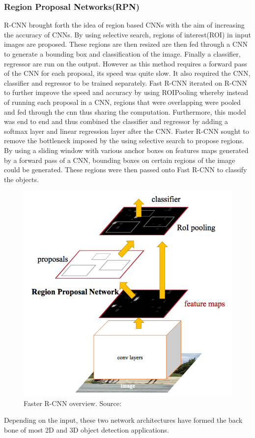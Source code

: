 \subsubsection*{Region Proposal Networks(RPN)}
R-CNN\cite{girshick2014rich} brought forth the idea of region based CNNs with the aim of increasing the accuracy of CNNs. By using selective search, regions of interest(ROI) in input images are proposed. These regions are then resized are then fed through a CNN to generate a bounding box and classification of the image. Finally a classifier, regressor are run on the output. However as this method requires a forward pass of the CNN for each proposal, its speed was quite slow. It also required the CNN, classifier and regressor to be trained separately. 
Fast R-CNN\cite{girshickICCV15fastrcnn} iterated on R-CNN to further improve the speed and accuracy by using ROIPooling whereby instead of running each proposal in a CNN, regions that were overlapping were pooled and fed through the cnn thus sharing the computation. Furthermore, this model was end to end and thus combined the  classifier and regressor  by adding a softmax layer and linear regression layer after the CNN.
Faster R-CNN\cite{ren2015faster} sought to remove the bottleneck imposed by the using selective search to propose regions. By using a sliding window with various anchor boxes on features maps generated by a forward pass of a CNN, bounding boxes on certain regions of the image could be generated. These regions were then passed onto Fast R-CNN to classify the objects. 
\begin{figure}[h]
	\centering
	\includegraphics[width=0.5\linewidth]{images/fastercnn}
	\caption{Faster R-CNN overview. Source:\cite{ren2015faster}}
\end{figure}


Depending on the input, these two network architectures have formed the back bone of most 2D and 3D object detection applications. 
